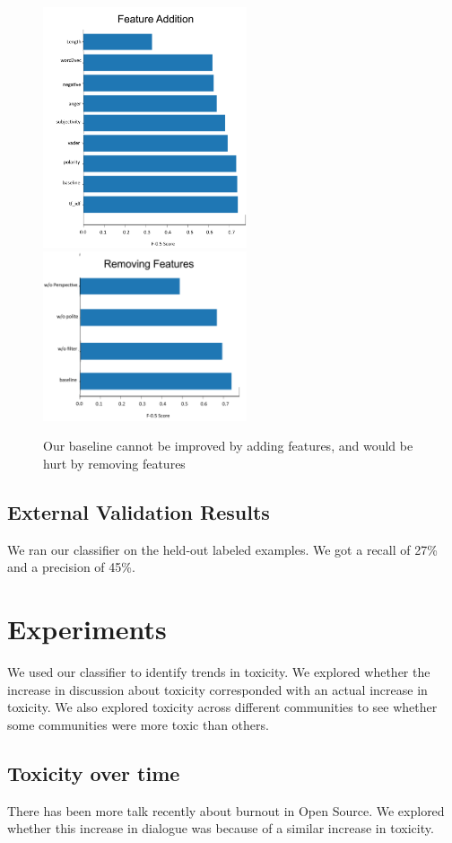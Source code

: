 \documentclass[conference]{IEEEtran}
\begin{document}
\begin{figure} 
\includegraphics[width=6cm]{feature.png}
\includegraphics[width=6cm]{remove_features.png}
\caption{Our baseline cannot be improved by adding features, and would be hurt by removing features} 
\end{figure} 

\subsection{External Validation Results} 
We ran our classifier on the held-out labeled examples. We got a recall of 27\% and a precision of 45\%. 

\section{Experiments} 

We used our classifier to identify trends in toxicity. We explored whether the increase in discussion about toxicity corresponded with an actual increase in toxicity. We also explored toxicity across different communities to see whether some communities were more toxic than others. 

\subsection{Toxicity over time} 
There has been more talk recently about burnout in Open Source. We explored whether this increase in dialogue was because of a similar increase in toxicity. 
\end{document}
